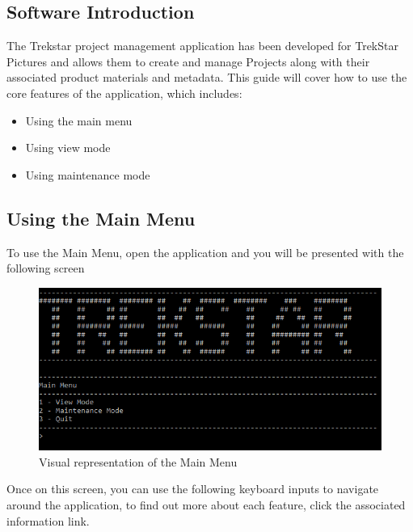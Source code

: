 \documentclass[
  english,
  a4paper,
,tablecaptionabove
]{scrartcl}
\providecommand{\tightlist}{%
  \setlength{\itemsep}{0pt}\setlength{\parskip}{0pt}}
\begin{document}
\hypertarget{software-introduction}{%
\subsection{Software Introduction}\label{software-introduction}}

The Trekstar project management application has been developed for
TrekStar Pictures and allows them to create and manage Projects along
with their associated product materials and metadata. This guide will
cover how to use the core features of the application, which includes:

\begin{itemize}
\tightlist
\item
  Using the main menu
\item
  Using view mode
\item
  Using maintenance mode
\end{itemize}

\hypertarget{using-the-main-menu}{%
\subsection{Using the Main Menu}\label{using-the-main-menu}}

To use the Main Menu, open the application and you will be presented
with the following screen

\begin{figure}
\centering
\includegraphics{images/user-guide/main-menu/using-the-main-menu.png}
\caption{Visual representation of the Main Menu}
\end{figure}

Once on this screen, you can use the following keyboard inputs to
navigate around the application, to find out more about each feature,
click the associated information link.
\end{document}
